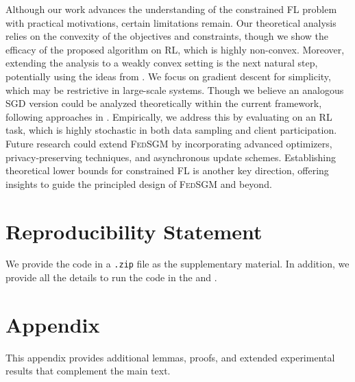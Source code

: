 \documentclass{article} %
\begin{document}
Although our work advances the understanding of the constrained FL problem with practical motivations, certain limitations remain. Our theoretical analysis relies on the convexity of the objectives and constraints, though we show the efficacy of the proposed algorithm on RL, which is highly non-convex. Moreover, extending the analysis to a weakly convex setting is the next natural step, potentially using the ideas from \citet{huang2023oracle}. We focus on gradient descent for simplicity, which may be restrictive in large-scale systems. Though we believe an analogous SGD version could be analyzed theoretically within the current framework, following approaches in \citet{lan2020algorithms,islamov2025safe}. Empirically, we address this by evaluating on an RL task, which is highly stochastic in both data sampling and client participation. Future research could extend \textsc{FedSGM} by incorporating advanced optimizers, privacy-preserving techniques, and asynchronous update schemes. Establishing theoretical lower bounds for constrained FL is another key direction, offering insights to guide the principled design of \textsc{FedSGM} and beyond.
\section*{Reproducibility Statement}

We provide the code in a \texttt{.zip} file as the supplementary material. In addition, we provide all the details to run the code in the  and . 



\newpage
\appendix

\section*{Appendix}

\startcontents[appendix]

\vspace{1em}
This appendix provides additional lemmas, proofs, and extended experimental results that complement the main text.
\end{document}
